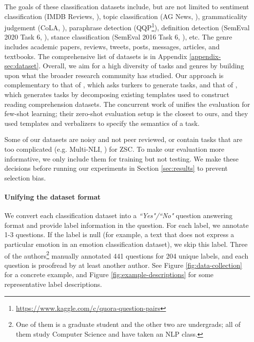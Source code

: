 The goals of these classification datasets include, but are not limited to sentiment classification (IMDB Reviews, \citet{maas-EtAl:2011:ACL-HLT2011}), topic classification (AG News, \citet{10.5555/2969239.2969312}), grammaticality judgement (CoLA, \citet{warstadt2018neural}), paraphrase detection (QQP\footnote{\url{https://www.kaggle.com/c/quora-question-pairs}}), definition detection (SemEval 2020 Task 6, \citet{spala-etal-2019-deft}), stance classification (SemEval 2016 Task 6, \citet{mohammad-etal-2016-semeval}),  etc. The genre includes academic papers, reviews, tweets, posts, messages, articles, and textbooks. The comprehensive list of datasets is in Appendix \ref{appendix-sec:dataset}.
Overall, we aim for a high diversity of tasks and genres by building upon what the broader research community has studied. Our approach is complementary to that of \citet{weller-etal-2020-learning}, which asks turkers to generate tasks, and that of \citet{mishra2021natural}, which generates tasks by decomposing existing templates used to construct reading comprehension datasets. The concurrent work of \citet{bragg2021flex} unifies the evaluation for few-shot learning; their zero-shot evaluation setup is the closest to ours, and they used templates and verbalizers \cite{schick2020exploiting} to specify the semantics of a task. 

Some of our datasets are noisy and not peer reviewed, or contain tasks that are too complicated (e.g. Multi-NLI, \citet{williams-etal-2018-broad}) for ZSC. To make our evaluation more informative, we only include them for training but not testing. We make these decisions before running our experiments in Section \ref{sec:results} to prevent selection bias. 

\paragraph{Unifying the dataset format}

We convert each classification dataset into a \textit{``Yes"/``No"} question answering format and provide label information in the question. For each label, we annotate 1-3 questions. If the label is null (for example, a text that does not express a particular emotion in an emotion classification dataset), we skip this label. Three of the authors\footnote{One of them is a graduate student and the other two are undergrads; all of them study Computer Science and have taken an NLP class.} manually annotated 441 questions for 204 unique labels, and each question is proofread by at least another author. See Figure \ref{fig:data-collection} for a concrete example, and Figure \ref{fig:example-descriptions} for some representative label descriptions. 


